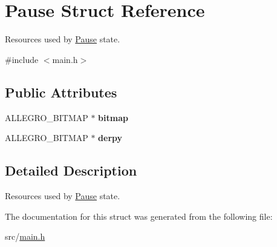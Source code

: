 \hypertarget{structPause}{\section{\-Pause \-Struct \-Reference}
\label{structPause}
}


\-Resources used by \hyperlink{structPause}{\-Pause} state.  




{\ttfamily \#include $<$main.\-h$>$}

\subsection*{\-Public \-Attributes}
\begin{DoxyCompactItemize}
\item 
\hypertarget{structPause_a50c6c3e5d72008c50ae7e3aba1c794d1}{\-A\-L\-L\-E\-G\-R\-O\-\_\-\-B\-I\-T\-M\-A\-P $\ast$ {\bfseries bitmap}}\label{structPause_a50c6c3e5d72008c50ae7e3aba1c794d1}

\item 
\hypertarget{structPause_aa2a1cde9971149a5c48f10899ca97079}{\-A\-L\-L\-E\-G\-R\-O\-\_\-\-B\-I\-T\-M\-A\-P $\ast$ {\bfseries derpy}}\label{structPause_aa2a1cde9971149a5c48f10899ca97079}

\end{DoxyCompactItemize}


\subsection{\-Detailed \-Description}
\-Resources used by \hyperlink{structPause}{\-Pause} state. 

\-The documentation for this struct was generated from the following file\-:\begin{DoxyCompactItemize}
\item 
src/\hyperlink{main_8h}{main.\-h}\end{DoxyCompactItemize}
